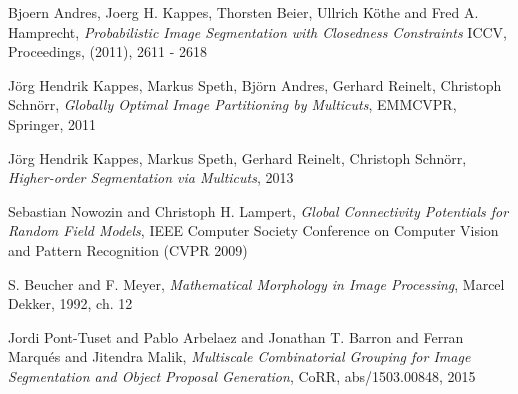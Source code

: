 \begin{thebibliography}{9}
 	Bjoern Andres, Joerg H. Kappes, Thorsten Beier, Ullrich Köthe and Fred A. Hamprecht, 
	\emph{Probabilistic Image Segmentation with Closedness Constraints}
	ICCV, Proceedings, (2011), 2611 - 2618
	
	
 	Jörg Hendrik Kappes, Markus Speth, Björn Andres, Gerhard Reinelt, Christoph Schnörr, 
 	\emph{Globally Optimal Image Partitioning by Multicuts},
 	EMMCVPR, Springer, 2011
 	
	
 	Jörg Hendrik Kappes, Markus Speth, Gerhard Reinelt, Christoph Schnörr, 
 	\emph{Higher-order Segmentation via Multicuts},
 	2013
 	

	Sebastian Nowozin and Christoph H. Lampert, 
	\emph{Global Connectivity Potentials for Random Field Models}, 
	IEEE Computer Society Conference on Computer Vision and Pattern Recognition (CVPR 2009)

 	S. Beucher and F. Meyer,
 	\emph{Mathematical  Morphology  in  Image  Processing}, 
 	Marcel Dekker, 1992, ch. 12

 	Jordi Pont{-}Tuset and Pablo Arbelaez and Jonathan T. Barron and Ferran Marqu{\'{e}}s and Jitendra Malik, 
 	\emph{Multiscale Combinatorial Grouping for Image Segmentation and Object Proposal Generation}, 
 	CoRR, abs/1503.00848, 2015

\end{thebibliography}

